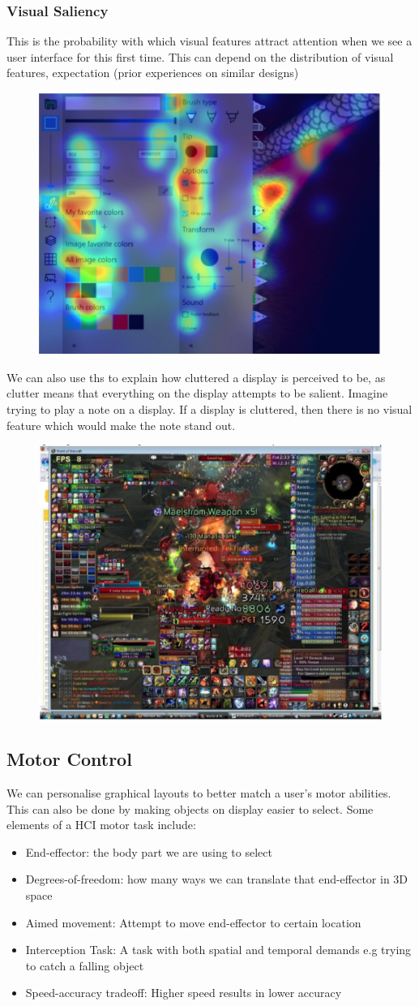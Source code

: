 \documentclass{article}
\begin{document}
\subsubsection*{Visual Saliency}
This is the probability with which visual features attract attention when we see a user interface for this first time. This can depend on the distribution of visual features, expectation (prior experiences on similar designs)
\begin{figure}[H]
    \centering
    \includegraphics[width=0.5\linewidth]{Pictures/Screenshot 2023-02-22 at 16.03.33.png}
\end{figure}
We can also use ths to explain how cluttered a display is perceived to be, as clutter means that everything on the display attempts to be salient. Imagine trying to play a note on a display. If a display is cluttered, then there is no visual feature which would make the note stand out.
\begin{figure}[H]
    \centering
    \includegraphics[width=0.5\linewidth]{Pictures/Screenshot 2023-02-22 at 16.05.03.png}
\end{figure}
\subsection{Motor Control}
We can personalise graphical layouts to better match a user's motor abilities. This can also be done by making objects on display easier to select. Some elements of a HCI motor task include:
\begin{itemize}
    \item End-effector: the body part we are using to select
    \item Degrees-of-freedom: how many ways we can translate that end-effector in 3D space
    \item Aimed movement: Attempt to move end-effector to certain location
    \item Interception Task: A task with both spatial and temporal demands e.g trying to catch a falling object
    \item Speed-accuracy tradeoff: Higher speed results in lower accuracy
\end{itemize}
\end{document}

